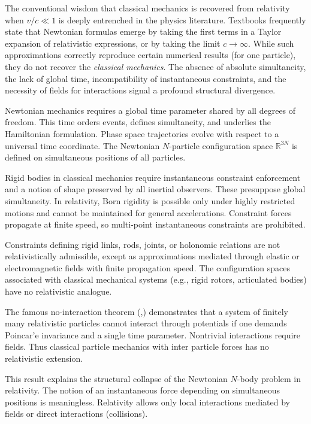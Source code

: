 The conventional wisdom that classical mechanics is recovered from relativity 
when $v/c \ll 1$ is deeply entrenched in the physics literature. Textbooks 
frequently state that Newtonian formulas emerge by taking the first terms in 
a Taylor expansion of relativistic expressions, or by taking the limit $c \to \infty$.
While such approximations correctly reproduce certain numerical results 
(for one particle), they do not recover the {\em classical mechanics}.
The absence of absolute simultaneity, the lack of global time, incompatibility 
of instantaneous constraints, and the necessity of fields for 
interactions signal a profound structural divergence.

Newtonian mechanics requires a global time parameter shared by all 
degrees of freedom. This time orders events, defines simultaneity, 
and underlies the Hamiltonian formulation. Phase space trajectories 
evolve with respect to a universal time coordinate. The Newtonian $N$-particle 
configuration space $\mathbb{R}^{3N}$ is defined on simultaneous positions of all particles.

Rigid bodies in classical mechanics require instantaneous constraint 
enforcement and a notion of shape preserved by all inertial observers. 
These presuppose global simultaneity. In relativity, Born rigidity 
is possible only under highly restricted motions and cannot be maintained 
for general accelerations. Constraint forces propagate at finite speed, 
so multi-point instantaneous constraints are prohibited.

Constraints defining rigid links, rods, joints, or holonomic relations 
are not relativistically admissible, except as approximations mediated 
through elastic or electromagnetic fields with finite propagation speed. 
The configuration spaces associated with classical mechanical systems 
(e.g., rigid rotors, articulated bodies) have no relativistic analogue.

The famous no-interaction theorem (\cite{cjs-no-int},\cite{leutwyler}) 
demonstrates that a system of finitely many relativistic particles 
cannot interact through potentials if one demands Poincar'e invariance 
and a single time parameter. Nontrivial interactions require fields. 
Thus classical particle mechanics with inter particle forces has no relativistic extension.

This result explains the structural collapse of the Newtonian 
$N$-body problem in relativity. The notion of an instantaneous 
force depending on simultaneous positions is meaningless. 
Relativity allows only local interactions mediated by fields or 
direct interactions (collisions).

